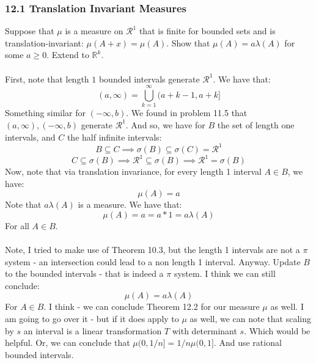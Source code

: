 \documentclass[12pt,a4paper]{article}
\newcommand{\1}[1]{\mathbbm{1}\left\{ #1 \right\}}
\newcommand{\R}{\mathbb{R}}
\newcommand{\rcal}{\mathcal{R}}
\begin{document}
\subsubsection{12.1 Translation Invariant Measures} Suppose that $\mu$ is a measure on $\rcal^1$ that is finite for bounded sets and is translation-invariant: $\mu(A + x) = \mu(A)$. Show that $\mu(A) = a\lambda(A)$ for some $a \geq 0$. Extend to $\R^k$.
\\\\
First, note that length $1$ bounded intervals generate $\rcal^1$. We have that:
$$
	(a,\infty) = \bigcup_{k=1}^\infty (a + k - 1, a + k]
$$
Something similar for $(-\infty,b)$. We found in problem 11.5 that $(a,\infty),(-\infty,b)$ generate $\rcal^1$. And so, we have for $B$ the set of length one intervals, and $C$ the half infinite intervals:
$$
	B \subseteq C \implies
	\sigma(B) \subseteq \sigma(C) = \rcal^1
$$
$$
	C \subseteq \sigma(B) \implies \rcal^1 \subseteq \sigma(B) \implies
	\rcal^1 = \sigma(B)
$$
Now, note that via translation invariance, for every length 1 interval $A \in B$, we have:
$$
	\mu(A) = a
$$
Note that $a\lambda(A)$ is a measure. We have that:
$$
	\mu(A) = a = a * 1 = a\lambda(A)
$$
For all $A \in B$.
\\\\
Note, I tried to make use of Theorem 10.3, but the length 1 intervals are not a $\pi$ system - an intersection could lead to a non length 1 interval. Anyway. Update $B$ to the bounded intervals - that is indeed a $\pi$ system. I think we can still conclude:
$$
	\mu(A) = a\lambda(A)
$$
For $A \in B$. I think - we can conclude Theorem 12.2 for our measure $\mu$ as well. I am going to go over it - but if it does apply to $\mu$ as well, we can note that scaling by $s$ an interval is a linear transformation $T$ with determinant $s$. Which would be helpful. Or, we can conclude that $\mu(0,1/n] = 1/n\mu(0,1]$. And use rational bounded intervals.
\end{document}
